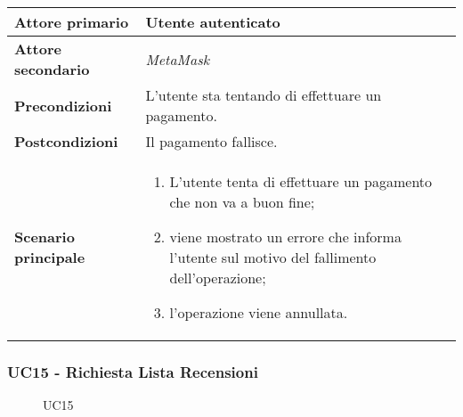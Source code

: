             \begin{center}
                \renewcommand{\arraystretch}{1.5}
                \begin{tabular}{m{10em} m{20em}}
                    \hline
                    \textbf{Attore primario} & Utente autenticato \\
                    \hline
                    \textbf{Attore secondario} & \textit{MetaMask} \\
                    \hline
                    \textbf{Precondizioni} & L'utente sta tentando di effettuare un pagamento. \\
                    \hline
                    \textbf{Postcondizioni} & Il pagamento fallisce. \\
                    \hline
                    \textbf{Scenario principale} &
                    \begin{enumerate}
                        \item L'utente tenta di effettuare un pagamento che non va a buon fine;
                        \item viene mostrato un errore che informa l'utente sul motivo del fallimento
                        dell'operazione;
                        \item l'operazione viene annullata.
                    \end{enumerate} \\
                    \hline
                \end{tabular}
            \end{center}

        \subsubsection{UC15 - Richiesta Lista Recensioni}
        \label{UC15}

            \begin{figure}[H]
                \centering
                
                \caption{UC15}
            \end{figure}

